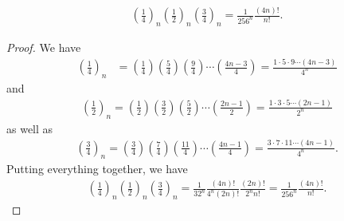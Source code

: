 \documentclass[10pt,a4paper]{amsart}
\begin{document}
\begin{lemma}\label{lemma hypergeometric}
\begin{align*}
    \left(\frac{1}{4}\right)_n\left(\frac{1}{2}\right)_n\left(\frac{3}{4}\right)_n=\frac{1}{256^n} \frac{\left(4n\right)!}{n!}.
\end{align*}
\end{lemma}

\begin{proof}
We have \begin{align*}
    \left(\frac{1}{4}\right)_n&=\left(\frac{1}{4}\right)\left(\frac{5}{4}\right)\left(\frac{9}{4}\right)\cdots \left(\frac{4n-3}{4}\right)=\frac{1\cdot 5 \cdot 9 \cdots \left(4n-3\right)}{4^n}
\end{align*}
and \begin{align*}
    \left(\frac{1}{2}\right)_n=\left(\frac{1}{2}\right)\left(\frac{3}{2}\right)\left(\frac{5}{2}\right)\cdots\left(\frac{2n-1}{2}\right)=\frac{1\cdot 3\cdot 5\cdots  \left(2n-1\right)}{2^n}
\end{align*}
as well as \begin{align*}
\left(\frac{3}{4}\right)_n=\left(\frac{3}{4}\right)\left(\frac{7}{4}\right)\left(\frac{11}{4}\right)\cdots \left(\frac{4n-1}{4}\right)=\frac{3\cdot 7 \cdot 11 \cdots\left(4n-1\right)}{4^n}.
\end{align*}
Putting everything together, we have
\begin{align*}
\left(\frac{1}{4}\right)_n\left(\frac{1}{2}\right)_n\left(\frac{3}{4}\right)_n=\frac{1}{32^n} \frac{\left(4n\right)!}{4^n\left(2n\right)!} \frac{\left(2n\right)!}{2^nn!}=\frac{1}{256^n} \frac{\left(4n\right)!}{n!}.
\end{align*}
\end{proof}
\end{document}
